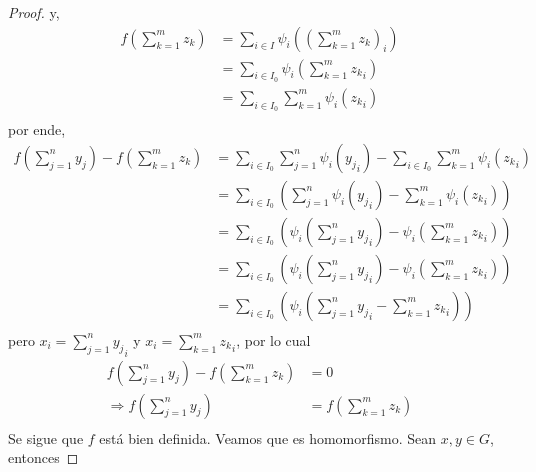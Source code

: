 \documentclass[12pt]{report}
\theoremstyle{largebreak}
\begin{document}
\begin{proof}
        y,
        \begin{equation*}
            \begin{split}
                f\left(\sum_{ k=1}^m z_k \right)&=\sum_{ i\in I}\psi_i\left(\left(\sum_{ k=1}^m z_k\right)_i\right)\\
                &=\sum_{ i\in I_0}\psi_i\left(\sum_{ k=1}^m {z_k}_i\right)\\
                &=\sum_{ i\in I_0}\sum_{ k=1}^m \psi_{ i}\left( {z_k}_{i}\right)\\
            \end{split}
        \end{equation*}
        por ende,
        \begin{equation*}
            \begin{split}
                f\left(\sum_{ j=1}^n y_j \right)-f\left(\sum_{ k=1}^m z_k \right)&=\sum_{ i\in I_0}\sum_{ j=1}^n \psi_{ i}\left( {y_j}_{i}\right)-\sum_{ i\in I_0}\sum_{ k=1}^m \psi_{ i}\left( {z_k}_{i}\right)\\
                &=\sum_{ i\in I_0}\left(\sum_{ j=1}^n \psi_{ i}\left( {y_j}_{i}\right)-\sum_{ k=1}^m \psi_{ i}\left( {z_k}_{i}\right)\right)\\
                &=\sum_{ i\in I_0}\left(\psi_{ i}\left(\sum_{ j=1}^n {y_j}_{i}\right)-\psi_{ i}\left(\sum_{ k=1}^m{z_k}_{i}\right)\right)\\
                &=\sum_{ i\in I_0}\left(\psi_{ i}\left(\sum_{ j=1}^n {y_j}_{i}\right)-\psi_{ i}\left(\sum_{ k=1}^m{z_k}_{i}\right)\right)\\
                &=\sum_{ i\in I_0}\left(\psi_{ i}\left(\sum_{ j=1}^n {y_j}_{i}-\sum_{ k=1}^m{z_k}_{i}\right)\right)\\
            \end{split}
        \end{equation*}
        pero $x_i=\sum_ { j=1}^n {y_j}_i$ y $x_i=\sum_ { k=1}^m {z_k}_i$, por lo cual
        \begin{equation*}
            \begin{split}
                f\left(\sum_{ j=1}^n y_j \right)-f\left(\sum_{ k=1}^m z_k \right)&=0\\
                \Rightarrow f\left(\sum_{ j=1}^n y_j \right)&=f\left(\sum_{ k=1}^m z_k \right)\\
            \end{split}
        \end{equation*}
        Se sigue que $f$ está bien definida. Veamos que es homomorfismo. Sean $x,y\in G$, entonces

\end{proof}
\end{document}
